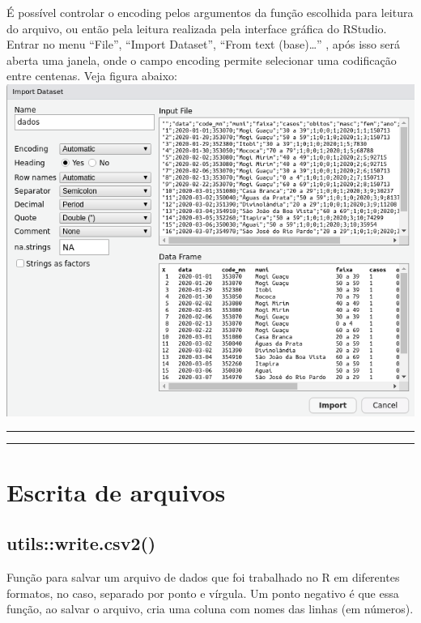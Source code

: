 \documentclass[
]{book}
\theoremstyle{definition}
\theoremstyle{definition}
\theoremstyle{definition}
\theoremstyle{definition}
\theoremstyle{remark}
\begin{document}
É possível controlar o encoding pelos argumentos da função escolhida para leitura do arquivo, ou então pela leitura realizada pela interface gráfica do RStudio. Entrar no menu ``File'', ``Import Dataset'', ``From text (base)\ldots{}'' , após isso será aberta uma janela, onde o campo encoding permite selecionar uma codificação entre centenas. Veja figura abaixo:
\includegraphics{ilustracoes/import_dataset.png}

\begin{center}\rule{0.5\linewidth}{0.5pt}\end{center}

\begin{center}\rule{0.5\linewidth}{0.5pt}\end{center}

\hypertarget{escrita-de-arquivos}{%
\section{Escrita de arquivos}\label{escrita-de-arquivos}}

\hypertarget{utilswrite.csv2}{%
\subsection{utils::write.csv2()}\label{utilswrite.csv2}}

Função para salvar um arquivo de dados que foi trabalhado no R em diferentes formatos, no caso, separado por ponto e vírgula. Um ponto negativo é que essa função, ao salvar o arquivo, cria uma coluna com nomes das linhas (em números).
\end{document}
